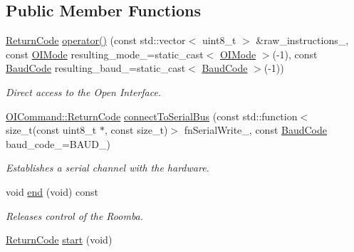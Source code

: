 \subsection*{Public Member Functions}
\begin{DoxyCompactItemize}
\item 
\hyperlink{classroomba_1_1series500_1_1oi_1_1_o_i_command_ab408b9562318caf292794d8ba335d5ed}{Return\+Code} \hyperlink{classroomba_1_1series500_1_1oi_1_1_o_i_command_a10cc13163c22f987a990e630e665990f}{operator()} (const std\+::vector$<$ uint8\+\_\+t $>$ \&raw\+\_\+instructions\+\_\+, const \hyperlink{namespaceroomba_1_1series500_1_1oi_a8dde6b4ac23e862ae50868c3963d7063}{O\+I\+Mode} resulting\+\_\+mode\+\_\+=static\+\_\+cast$<$ \hyperlink{namespaceroomba_1_1series500_1_1oi_a8dde6b4ac23e862ae50868c3963d7063}{O\+I\+Mode} $>$(-\/1), const \hyperlink{namespaceroomba_1_1series500_1_1oi_ae5028fe52e1dabe309aff04a45581bfd}{Baud\+Code} resulting\+\_\+baud\+\_\+=static\+\_\+cast$<$ \hyperlink{namespaceroomba_1_1series500_1_1oi_ae5028fe52e1dabe309aff04a45581bfd}{Baud\+Code} $>$(-\/1))
\begin{DoxyCompactList}\small\item\em Direct access to the Open Interface. \end{DoxyCompactList}\item 
\hyperlink{classroomba_1_1series500_1_1oi_1_1_o_i_command_ab408b9562318caf292794d8ba335d5ed}{O\+I\+Command\+::\+Return\+Code} \hyperlink{classroomba_1_1series500_1_1oi_1_1_o_i_command_ae2fe639f2810b3313d458569a06e0202}{connect\+To\+Serial\+Bus} (const std\+::function$<$ size\+\_\+t(const uint8\+\_\+t $\ast$, const size\+\_\+t)$>$ fn\+Serial\+Write\+\_\+, const \hyperlink{namespaceroomba_1_1series500_1_1oi_ae5028fe52e1dabe309aff04a45581bfd}{Baud\+Code} baud\+\_\+code\+\_\+=B\+A\+U\+D\+\_)
\begin{DoxyCompactList}\small\item\em Establishes a serial channel with the hardware. \end{DoxyCompactList}\item 
void \hyperlink{classroomba_1_1series500_1_1oi_1_1_o_i_command_aab3b21e362c733864e436d6d55549784}{end} (void) const 
\begin{DoxyCompactList}\small\item\em Releases control of the Roomba. \end{DoxyCompactList}\item 
\hyperlink{classroomba_1_1series500_1_1oi_1_1_o_i_command_ab408b9562318caf292794d8ba335d5ed}{Return\+Code} \hyperlink{classroomba_1_1series500_1_1oi_1_1_o_i_command_a7ed3acb5288d0c8b4e6e7684e7a24040}{start} (void)

\end{DoxyCompactItemize}
